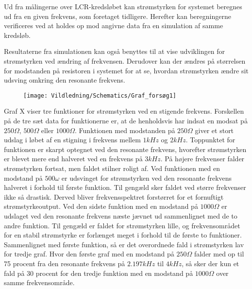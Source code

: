 Ud fra målingerne over LCR-kredsløbet kan strømstyrken for systemet beregnes ud fra en given frekvens, som foretaget tidligere. Herefter kan beregningerne verificeres ved at holdes op mod angivne data fra en simulation af samme kredsløb.

Resultaterne fra simulationen kan også benyttes til at vise udviklingen for strømstyrken ved ændring af frekvensen. Derudover kan der ændres på størrelsen for modstanden på resistoren i systemet for at se, hvordan strømstyrken ændre sit udsving omkring den resonante frekvens.

\begin{figure}[H]
\texttt{[image: Vildledning/Schematics/Graf\_forsøg1]}
\end{figure}

Graf X viser tre funktioner for strømstyrken ved en stigende frekvens. Forskellen på de tre sæt data for funktionerne er, at de henholdsvis har indsat en modsat på $250 \Omega$, $500 \Omega$ eller $1000 \Omega$. Funktionen med modstanden på $250 \Omega$ giver et stort udslag i løbet af en stigning i frekvens mellem $1 kHz$ og $2 kHz$. Toppunktet for funktionen er skarpt optegnet ved den resonante frekvens, hvorefter strømstyrken er blevet mere end halveret ved en frekvens på $3 kHz$. På højere frekvenser falder strømstyrken fortsat, men faldet stilner roligt af. Ved funktionen med en modstand på $500 \omega$ er udsvinget for strømstyrken ved den resonante frekvens halveret i forhold til første funktion. Til gengæld sker faldet ved større frekvenser ikke så drastisk. Derved bliver frekvensspektret forstørret for et fornuftigt strømstyrkeoutput. Ved den sidste funktion med en modstand på $1000 \Omega$ er udslaget ved den resonante frekvens næste jævnet ud sammenlignet med de to andre funktion. Til gengæld er faldet for strømstyrken lille, og frekvensområdet for en stabil strømstyrke er forlænget meget i forhold til de første to funktioner. Sammenlignet med første funktion, så er det overordnede fald i strømstyrken lav for tredje graf. Hvor den første graf med en modstand på $250 \Omega$ falder med op til 75 procent fra den resonante frekvens på $2.197 kHz$ til $4 kHz$, så sker der kun et fald på 30 procent for den tredje funktion med en modstand på $1000 \Omega$ over samme frekvensområde.